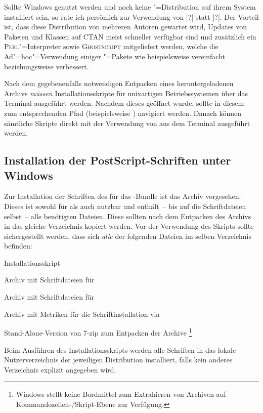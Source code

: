 Sollte Windows genutzt werden und noch keine "=Distribution auf 
ihrem System installiert sein, so rate ich persönlich zur Verwendung von 
|?| statt |?|. 
Der Vorteil ist, dass diese Distribution von mehreren Autoren gewartet wird, 
Updates von Paketen und Klassen auf CTAN meist schneller verfügbar sind und 
zusätzlich ein \textsc{Perl}"=Interpreter sowie \textsc{Ghostscript} 
mitgeliefert werden, welche die Ad"=hoc"=Verwendung einiger 
"=Pakete wie beispielsweise  vereinfacht 
beziehungsweise verbessert.

Nach dem gegebenenfalls notwendigen Entpacken eines heruntergeladenen Archivs
\emph{müssen} Installationsskripte für unixartigen Betriebssystemen über das 
Terminal ausgeführt werden. Nachdem dieses geöffnet wurde, sollte in diesem zum 
entsprechenden Pfad (beispielsweise ) 
navigiert werden. Danach können sämtliche Skripte direkt mit der Verwendung von
 aus dem Terminal ausgeführt werden.


\subsection{Installation der PostScript-Schriften unter Windows}
\label{sec:install:fonts:win}
Zur Installation der Schriften des \CDs für das \TUDScript-Bundle ist das Archiv
%
{} vorgesehen. Dieses ist sowohl für 
 als auch  
nutzbar und enthält~-- bis auf die Schriftdateien selbst~-- alle benötigten 
Dateien. Diese sollten nach dem Entpacken des Archivs in das gleiche 
Verzeichnis kopiert werden. Vor der Verwendung des Skripts 
 sollte sichergestellt werden, dass sich 
\emph{alle} der folgenden Dateien im selben Verzeichnis befinden:
%
%
\begin{description}[labelwidth=\tempdim,labelsep=1em]
  \item[\File{tudscrfonts\_install.bat}]Installationsskript
  \item[\File{Univers\_PS.zip}]Archiv mit Schriftdateien für \Univers
  \item[\File{DIN\_Bd\_PS.zip}]Archiv mit Schriftdateien für \DIN
  \item[\File{tudscrfonts.zip}]Archiv mit Metriken für die
    Schriftinstallation via 
  \item[\File{7za.exe}]Stand-Alone-Version von 7-zip zum Entpacken der Archive%
    \footnote{%
      Windows stellt keine Bordmittel zum Extrahieren von Archiven auf 
      Kommandozeilen-/Skript-Ebene zur Verfügung.%
    }%
\end{description}
%
Beim Ausführen des Installationsskripts werden alle Schriften in das lokale 
Nutzerverzeichnis der jeweiligen Distribution installiert, falls kein anderes 
Verzeichnis explizit angegeben wird.

